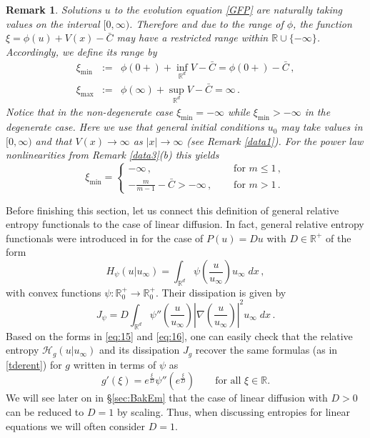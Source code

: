 \documentclass[reqno]{amsart}
\newtheorem{remark}[lemma]{Remark}
\newcommand{\R}{\mathbb{R}}
\newcommand{\Rd}{{\R^d}}
\begin{document}
\begin{remark}\label{xi-range}
 Solutions $u$ to the evolution equation \eqref{GFP} are naturally taking values on the interval $[0,\infty)$. Therefore and due to the range of $\phi$, the function $\xi= \phi(u)+V(x)-\bar C$ may have a restricted range within $\R\cup\{-\infty\}$. Accordingly, we define its range by
\begin{eqnarray*}%
 \xi_{\min} &:= & \phi(0+)+\inf_\Rd V-\bar C=\phi(0+)-\bar C\,,\\
  \xi_{\max} &:= & \phi(\infty)+\sup_\Rd V-\bar C=\infty\,.
\end{eqnarray*}
Notice that in the non-degenerate case $\xi_{\min}=-\infty$ while $\xi_{\min}>-\infty$ in the degenerate case. 
Here we use that general initial conditions $u_0$ may take values in $[0,\infty)$ and that $V(x)\to\infty$ as $|x|\to\infty$ (see Remark \ref{data1}). 
For the power law nonlinearities from Remark \ref{data3}(b) this yields 
$$
  \xi_{\min} =
  \begin{cases}
  -\infty\,, \quad & \mbox{ for }m\le1\,,\\
  -\frac{m}{m-1}-\bar C>-\infty\,, \quad &\mbox{ for }m>1\,.
  \end{cases}
$$
\end{remark}

Before finishing this section, let us connect this definition of general relative entropy functionals to the case of linear diffusion. In fact, general relative entropy functionals were introduced in \cite{AMTU} for the case of $P(u)=Du$ with $D\in \R^+$ of the form
\begin{equation}\label{eq:15}
 H_\psi (u|u_\infty) = \int_{\R^d} \psi\left(\frac{u}{u_\infty}\right)u_\infty\;dx\,,
\end{equation}
with convex functions $\psi:\R_0^+\longrightarrow \R_0^+$. Their dissipation is given by
\begin{equation}\label{eq:16}
 J_\psi = D\int_{\R^d} \psi''\left(\frac{u}{u_\infty}\right)
  \left|\nabla\left(\frac{u}{u_\infty}\right)\right|^2 u_\infty\;dx\,.
\end{equation}
Based on the forms in \eqref{eq:15} and \eqref{eq:16}, one can easily check that the relative entropy $\mathcal{H}_g(u|u_\infty)$ and its dissipation $J_g$ recover the same formulas (as in \eqref{tderent}) for $g$ written in terms of $\psi$ as
\begin{equation}\label{eq:17}
  g'(\xi) = e^{\frac{\xi}{D}}\psi''(e^{\frac{\xi}{D}}) \qquad \mbox{for all } \xi\in\R.
\end{equation}
We will see later on in \S\ref{sec:BakEm} that the case of linear diffusion with $D>0$ can be reduced to $D=1$ by scaling. Thus, when discussing entropies for linear equations we will often consider $D=1$.
\end{document}
